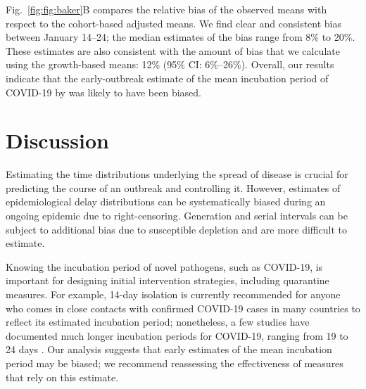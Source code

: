 \documentclass[12pt]{article}
\newcommand{\fref}[1]{Fig.~\ref{fig:#1}}
\begin{document}
\fref{fig:baker}B compares the relative bias of the observed means with respect to the cohort-based adjusted means.
We find clear and consistent bias between January 14--24;
the median estimates of the bias range from 8\% to 20\%.
These estimates are also consistent with the amount of bias that we calculate using the growth-based means: 12\% (95\% CI: 6\%--26\%).
Overall, our results indicate that the early-outbreak estimate of the mean incubation period of COVID-19 by \cite{backer2020incubation} was likely to have been biased.


\section{Discussion}

Estimating the time distributions underlying the spread of disease is crucial for predicting the course of an outbreak and controlling it.
However, estimates of epidemiological delay distributions can be systematically biased during an ongoing epidemic due to right-censoring.
Generation and serial intervals can be subject to additional bias due to susceptible depletion and are more difficult to estimate.

Knowing the incubation period of novel pathogens, such as COVID-19, is important for designing initial intervention strategies, including quarantine measures.
For example, 14-day isolation is currently recommended for anyone who comes in close contacts with confirmed COVID-19 cases in many countries to reflect its estimated incubation period;
nonetheless, a few studies have documented much longer incubation periods for COVID-19, ranging from 19 to 24 days \citep{bai2020presumed, guan2020clinical}.
Our analysis suggests that early estimates of the mean incubation period may be biased;
we recommend reassessing the effectiveness of measures that rely on this estimate.
\end{document}
